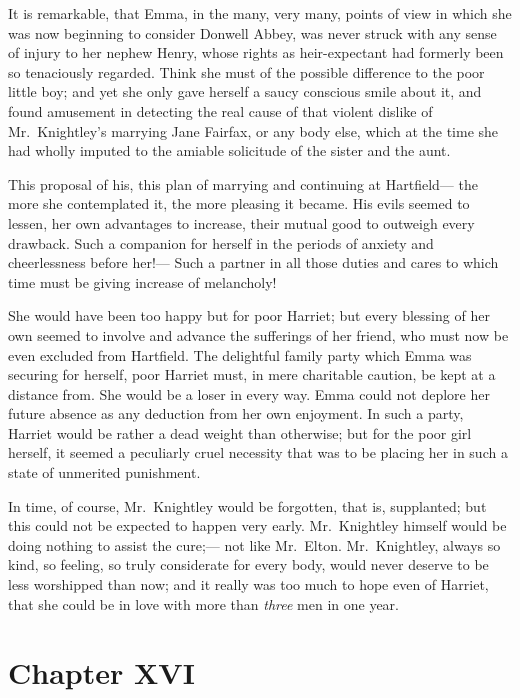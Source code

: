 It is remarkable, that Emma, in the many, very many, points of view
in which she was now beginning to consider Donwell Abbey, was never
struck with any sense of injury to her nephew Henry, whose rights
as heir-expectant had formerly been so tenaciously regarded.
Think she must of the possible difference to the poor little boy;
and yet she only gave herself a saucy conscious smile about it,
and found amusement in detecting the real cause of that violent
dislike of Mr.\ Knightley's marrying Jane Fairfax, or any body else,
which at the time she had wholly imputed to the amiable solicitude of
the sister and the aunt.

This proposal of his, this plan of marrying and continuing at Hartfield---%
the more she contemplated it, the more pleasing it became.
His evils seemed to lessen, her own advantages to increase,
their mutual good to outweigh every drawback.  Such a companion
for herself in the periods of anxiety and cheerlessness before her!---%
Such a partner in all those duties and cares to which time must be
giving increase of melancholy!

She would have been too happy but for poor Harriet; but every
blessing of her own seemed to involve and advance the sufferings
of her friend, who must now be even excluded from Hartfield.
The delightful family party which Emma was securing for herself,
poor Harriet must, in mere charitable caution, be kept at a
distance from.  She would be a loser in every way.  Emma could not
deplore her future absence as any deduction from her own enjoyment.
In such a party, Harriet would be rather a dead weight than otherwise;
but for the poor girl herself, it seemed a peculiarly cruel necessity
that was to be placing her in such a state of unmerited punishment.

In time, of course, Mr.\ Knightley would be forgotten, that is,
supplanted; but this could not be expected to happen very early.
Mr.\ Knightley himself would be doing nothing to assist the cure;---%
not like Mr.\ Elton.  Mr.\ Knightley, always so kind, so feeling,
so truly considerate for every body, would never deserve to be
less worshipped than now; and it really was too much to hope even
of Harriet, that she could be in love with more than \emph{three} men
in one year.



\chapter{Chapter XVI}


